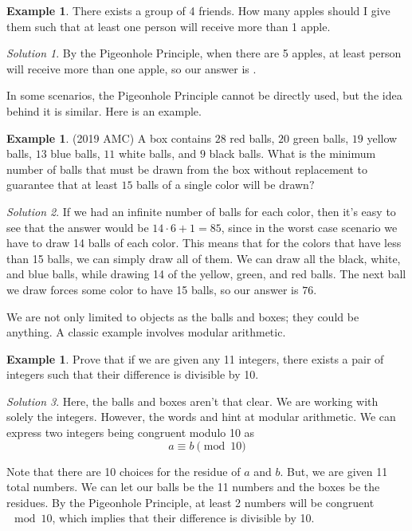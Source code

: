 \documentclass[l1pt]{article}
\theoremstyle{plain}
\theoremstyle{definition}
\newtheorem{example}[thm]{Example}
\theoremstyle{remark}
\newtheorem*{solution}{Solution}
\begin{document}
\begin{example}
There exists a group of 4 friends. How many apples should I give them such that at least one person will receive more than 1 apple.
\end{example}

\begin{solution}
By the Pigeonhole Principle, when there are 5 apples, at least person will receive more than one apple, so our answer is .
\end{solution}

\bigskip

In some scenarios, the Pigeonhole Principle cannot be directly used, but the idea behind it is similar. Here is an example.

\begin{example}
(2019 AMC) A box contains $28$ red balls, $20$ green balls, $19$ yellow balls, $13$ blue balls, $11$ white balls, and $9$ black balls. What is the minimum number of balls that must be drawn from the box without replacement to guarantee that at least $15$ balls of a single color will be drawn$?$
\end{example}

\begin{solution}
If we had an infinite number of balls for each color, then it's easy to see that the answer would be $14\cdot 6+1=85$, since in the worst case scenario we have to draw 14 balls of each color. This means that for the colors that have less than 15 balls, we can simply draw all of them. We can draw all the black, white, and blue balls, while drawing 14 of the yellow, green, and red balls. The next ball we draw forces some color to have 15 balls, so our answer is $\boxed{76}$.
\end{solution}

\bigskip

We are not only limited to objects as the balls and boxes; they could be anything. A classic example involves modular arithmetic.

\begin{example}
Prove that if we are given any 11 integers, there exists a pair of integers such that their difference is divisible by 10.
\end{example}

\begin{solution}
Here, the balls and boxes aren't that clear. We are working with solely the integers. However, the words  and  hint at modular arithmetic. We can express two integers being congruent modulo 10 as \[a \equiv b \pmod {10}\]

Note that there are 10 choices for the residue of $a$ and $b$. But, we are given 11 total numbers. We can let our balls be the 11 numbers and the boxes be the residues. By the Pigeonhole Principle, at least 2 numbers will be congruent $\mod 10$, which implies that their difference is divisible by 10.
\end{solution}
\end{document}
